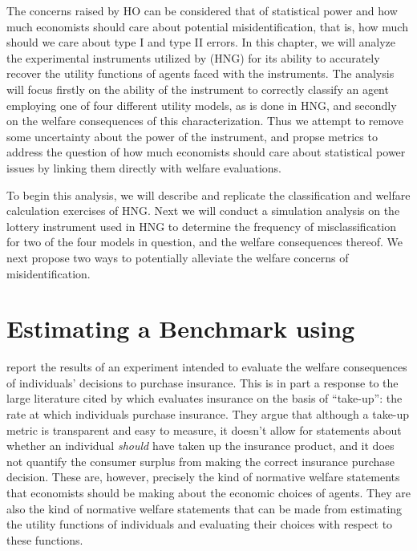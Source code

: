 \documentclass[../main.tex]{subfiles}
\begin{document}
The concerns raised by HO can be considered that of statistical power and how much economists should care about potential misidentification, that is, how much should we care about type I and type II errors.
In this chapter, we will analyze the experimental instruments utilized by \textcite{Harrison2016} (HNG) for its ability to accurately recover the utility functions of agents faced with the instruments.
The analysis will focus firstly on the ability of the instrument to correctly classify an agent employing one of four different utility models, as is done in HNG, and secondly on the welfare consequences of this characterization.
Thus we attempt to remove some uncertainty about the power of the instrument, and propse metrics to address the question of how much economists should care about statistical power issues by linking them directly with welfare evaluations.

To begin this analysis, we will describe and replicate the classification and welfare calculation exercises of HNG.
Next we will conduct a simulation analysis on the lottery instrument used in HNG to determine the frequency of misclassification for two of the four models in question, and the welfare consequences thereof.
We next propose two ways to potentially alleviate the welfare concerns of misidentification.

\section{Estimating a Benchmark using \texorpdfstring{\textcite{Harrison2016}}{Harrison and Ng (2015)}}
\label{sec4:Bench}

\textcite{Harrison2016} report the results of an experiment intended to evaluate the welfare consequences of individuals' decisions to purchase insurance.
This is in part a response to the large literature cited by \textcite[92]{Harrison2016} which evaluates insurance on the basis of \enquote{take-up}: the rate at which individuals purchase insurance.
They argue that although a take-up metric is transparent and easy to measure, it doesn't allow for statements about whether an individual \textit{should} have taken up the insurance product, and it does not quantify the consumer surplus from making the correct insurance purchase decision.
These are, however, precisely the kind of normative welfare statements that economists should be making about the economic choices of agents.
They are also the kind of normative welfare statements that can be made from estimating the utility functions of individuals and evaluating their choices with respect to these functions.
\end{document}
